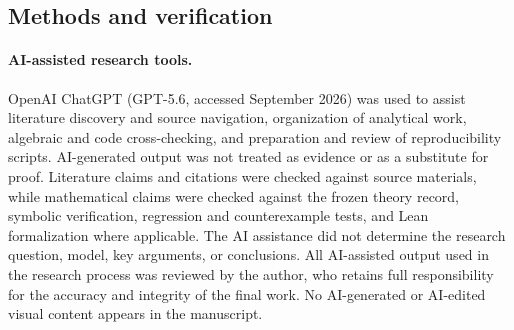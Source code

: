 \subsection{Methods and verification}
\label{sec:methods-verification}

\paragraph{AI-assisted research tools.}
OpenAI ChatGPT (GPT-5.6, accessed September 2026) was used to assist literature discovery and source navigation, organization of analytical work, algebraic and code cross-checking, and preparation and review of reproducibility scripts. AI-generated output was not treated as evidence or as a substitute for proof. Literature claims and citations were checked against source materials, while mathematical claims were checked against the frozen theory record, symbolic verification, regression and counterexample tests, and Lean formalization where applicable. The AI assistance did not determine the research question, model, key arguments, or conclusions. All AI-assisted output used in the research process was reviewed by the author, who retains full responsibility for the accuracy and integrity of the final work. No AI-generated or AI-edited visual content appears in the manuscript.
